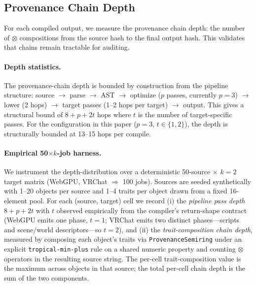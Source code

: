 \documentclass[sigconf,nonacm]{acmart}
\providecommand{\measuredFrom}[1]{}
\newcommand{\tropmult}{\otimes}
\begin{document}
\subsection{Provenance Chain Depth}

For each compiled output, we measure the provenance chain depth:
the number of $\tropmult$ compositions from the source hash
to the final output hash. This validates that chains remain
tractable for auditing.

\paragraph{Depth statistics.}
The provenance-chain depth is bounded by construction from the pipeline
structure: source $\rightarrow$ parse $\rightarrow$ AST $\rightarrow$
optimize ($p$ passes, currently $p{=}3$) $\rightarrow$ lower (2 hops)
$\rightarrow$ target passes (1--2 hops per target) $\rightarrow$ output.
This gives a structural bound of $8{+}p{+}2t$ hops where $t$ is the number
of target-specific passes. For the configuration in this paper
($p{=}3$, $t\in\{1,2\}$), the depth is structurally bounded at 13--15 hops
per compile.

\paragraph{Empirical 50$\times k$-job harness.}
We instrument the depth-distribution over a deterministic 50-source
$\times$ $k{=}2$ target matrix (WebGPU, VRChat $\Rightarrow$ 100 jobs).
Sources are seeded synthetically with 1--20 objects per source and 1--4
traits per object drawn from a fixed 16-element pool. For each
(source, target) cell we record (i) the \emph{pipeline pass depth}
$8{+}p{+}2t$ with $t$ observed empirically from the compiler's
return-shape contract (WebGPU emits one phase, $t{=}1$; VRChat emits two
distinct phases---scripts and scene/world descriptors---so $t{=}2$), and
(ii) the \emph{trait-composition chain depth}, measured by composing
each object's traits via \texttt{ProvenanceSemiring} under an explicit
\texttt{tropical-min-plus} rule on a shared numeric property and
counting $\tropmult$ operators in the resulting source string. The
per-cell trait-composition value is the maximum across objects in that
source; the total per-cell chain depth is the sum of the two
components.
\measuredFrom{HoloScript/packages/core/src/compiler/__tests__/paper-10-depth-distribution-50xk.bench.test.ts}%
\measuredFrom{HoloScript/.bench-logs/2026-04-27-paper-10-depth-distribution-50xk.md}
\end{document}
